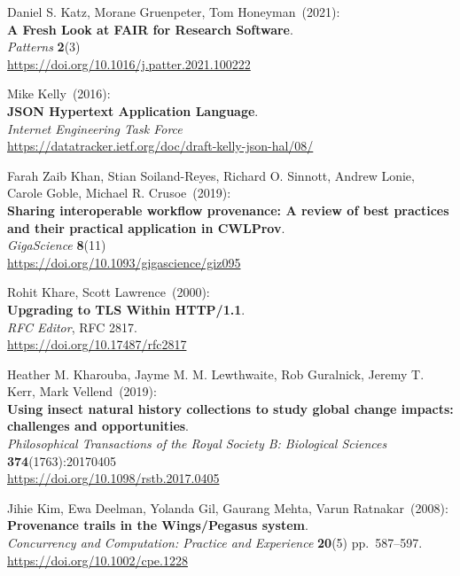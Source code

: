 \begin{thebibliography}{9}
Daniel S. Katz, Morane Gruenpeter, Tom Honeyman~(2021): \\
\textbf{A Fresh Look at FAIR for Research Software}.\\
\emph{Patterns} \textbf{2}(3) \\
\url{https://doi.org/10.1016/j.patter.2021.100222}

Mike Kelly~(2016): \\
\textbf{JSON Hypertext Application Language}.\\
\emph{Internet Engineering Task Force}\\
\url{https://datatracker.ietf.org/doc/draft-kelly-json-hal/08/}

Farah Zaib Khan, Stian Soiland-Reyes, Richard O. Sinnott, Andrew Lonie, Carole Goble, Michael R. Crusoe~(2019): \\
\textbf{Sharing interoperable workflow provenance: A review of best practices and their practical application in CWLProv}.\\
\emph{GigaScience} \textbf{8}(11)\\
\url{https://doi.org/10.1093/gigascience/giz095}

Rohit Khare, Scott Lawrence~(2000): \\
\textbf{Upgrading to {TLS Within HTTP}/1.1}.\\
\emph{RFC Editor}, RFC 2817. \\
\url{https://doi.org/10.17487/rfc2817}

Heather M. Kharouba, Jayme M. M. Lewthwaite, Rob Guralnick, Jeremy T. Kerr, Mark Vellend~(2019): \\
\textbf{Using insect natural history collections to study global change impacts: challenges and opportunities}.\\
\emph{Philosophical Transactions of the Royal Society B: Biological Sciences}
\textbf{374}(1763):20170405\\
\url{https://doi.org/10.1098/rstb.2017.0405}

Jihie Kim, Ewa Deelman, Yolanda Gil, Gaurang Mehta, Varun Ratnakar~(2008): \\
\textbf{Provenance trails in the Wings/Pegasus system}.\\
\emph{Concurrency and Computation: Practice and Experience}
\textbf{20}(5) pp.~587--597.\\
\url{https://doi.org/10.1002/cpe.1228}


\end{thebibliography}
